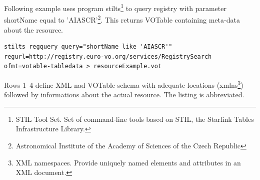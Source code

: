 Following example uses program stilts\footnote{STIL Tool Set. Set of
  command-line tools based on STIL, the Starlink Tables Infrastructure
  Library.} to query registry with parameter shortName equal to
'AIASCR'\footnote{Astronomical Institute of the Academy of Sciences of
  the Czech Republic}. This returns VOTable containing meta-data
about the resource. 

\begin{lstlisting}[frame=single]
stilts regquery query="shortName like 'AIASCR'"
regurl=http://registry.euro-vo.org/services/RegistrySearch
ofmt=votable-tabledata > resourceExample.vot
\end{lstlisting}

Rows 1--4 define XML nad VOTable schema with adequate locations
(xmlns\footnote{XML namespaces. Provide uniquely named elements and
  attributes in an XML document.}) followed by informations about the
actual resource. The listing is abbreviated.

  

    

    




